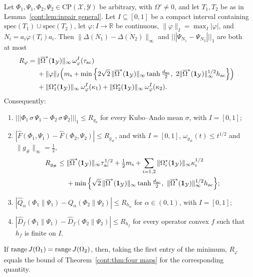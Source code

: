 \begin{theorem}\label{cont:thm:different supports}
Let $\Phi_1,\Psi_1,\Phi_2,\Psi_2\in\mathrm{CP}(\mathcal{X},\mathcal{Y})$ be arbitrary, with $\Omega'\neq0$, and let $T_1,T_2$ be as in Lemma~\ref{cont:lem:inpair general}. Let $I\subseteq[0,1]$ be a compact interval containing $\mathrm{spec}(T_1)\cup\mathrm{spec}(T_2)$, let $\varphi:I\to\mathbb{R}$ be continuous, $\|\varphi\|_I=\max_I|\varphi|$, and $N_i=a_i\varphi(T_i)a_i$. Then $\|\Delta(N_1)-\Delta(N_2)\|_\infty$ and $|||\Psi_{N_1}-\Psi_{N_2}|||_1$ are both at most
\begin{align*}
R_\varphi={}&\|\overline{\Omega}^*(\mathbf{1}_{\mathcal{Y}})\|_\infty\,\omega^I_\varphi(\tau_{\rm ac})\\%
&+\|\varphi\|_I\Big(m_{\rm s}+\min\Big\{2\sqrt2\,\|\overline{\Omega}^*(\mathbf{1}_{\mathcal{Y}})\|_\infty\tanh\tfrac{d_{\rm ac}}{2},\ 2\|\overline{\Omega}^*(\mathbf{1}_{\mathcal{Y}})\|_\infty^{1/2}h_{\rm ac}\Big\}\Big)\\
&+\|\Omega_1^*(\mathbf{1}_{\mathcal{Y}})\|_\infty\,\omega^I_\varphi(\kappa_1)+\|\Omega_2^*(\mathbf{1}_{\mathcal{Y}})\|_\infty\,\omega^I_\varphi(\kappa_2).
\end{align*}
Consequently:
\begin{enumerate}
\item[(a)] $|||\Phi_1\,\sigma\,\Psi_1-\Phi_2\,\sigma\,\Psi_2|||_1\leq R_{g_\sigma}$ for every Kubo--Ando mean $\sigma$, with $I=[0,1]$;
\item[(b)] $|\widehat F(\Phi_1,\Psi_1)-\widehat F(\Phi_2,\Psi_2)|\leq R_{g_\#}$, and with $I=[0,1]$, $\omega_{g_\#}(t)\leq t^{1/2}$ and $\|g_\#\|_\infty=\frac12$,
\[
\begin{aligned}
R_{g_\#}\leq{}&\|\overline{\Omega}^*(\mathbf{1}_{\mathcal{Y}})\|_\infty\tau_{\rm ac}^{1/2}+\tfrac12m_{\rm s}+\sum_{i=1,2}\|\Omega_i^*(\mathbf{1}_{\mathcal{Y}})\|_\infty\kappa_i^{1/2}\\
&+\min\Big\{\sqrt2\,\|\overline{\Omega}^*(\mathbf{1}_{\mathcal{Y}})\|_\infty\tanh\tfrac{d_{\rm ac}}{2},\ \|\overline{\Omega}^*(\mathbf{1}_{\mathcal{Y}})\|_\infty^{1/2}h_{\rm ac}\Big\};
\end{aligned}
\]
\item[(c)] $|\widehat Q_\alpha(\Phi_1\|\Psi_1)-\widehat Q_\alpha(\Phi_2\|\Psi_2)|\leq R_{h_\alpha}$ for $\alpha\in(0,1)$, with $I=[0,1]$;
\item[(d)] $|\widehat D_f(\Phi_1\|\Psi_1)-\widehat D_f(\Phi_2\|\Psi_2)|\leq R_{h_f}$ for every operator convex $f$ such that $h_f$ is finite on $I$.
\end{enumerate}
If $\operatorname{range} J(\Omega_1)=\operatorname{range} J(\Omega_2)$, then, taking the first entry of the minimum, $R_\varphi$ equals the bound of Theorem~\ref{cont:thm:four maps} for the corresponding quantity.
\end{theorem}

